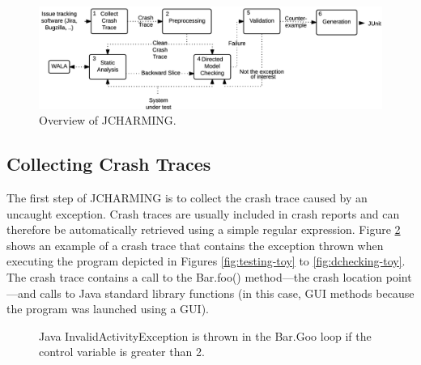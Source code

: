 \documentclass[times]{smrauth}
\begin{document}
\begin{figure}[h!]
  \centering
    \includegraphics[scale=0.8]{media/jcharming-approach.png}
    \caption{Overview of JCHARMING.
    \label{fig:jcarming-approach}}
\end{figure}

\subsection{Collecting Crash Traces}

The first step of JCHARMING is to collect the crash trace
caused by an uncaught exception. Crash traces are usually included in crash reports and can therefore be automatically
retrieved using a simple regular expression.
Figure \ref{fig:jcarming-traces} shows an example of a crash trace that contains the
exception thrown when executing the program depicted in
Figures \ref{fig:testing-toy} to \ref{fig:dchecking-toy}. The crash trace contains a call to the Bar.foo()
method—the crash location point—and calls to Java standard
library functions (in this case, GUI methods because the
program was launched using a GUI).

\begin{figure}[h!]
  \noindent{}
    \caption{Java InvalidActivityException is thrown in the Bar.Goo loop if the control variable is greater than 2.
    \label{fig:jcarming-traces}}
\end{figure}
\end{document}
